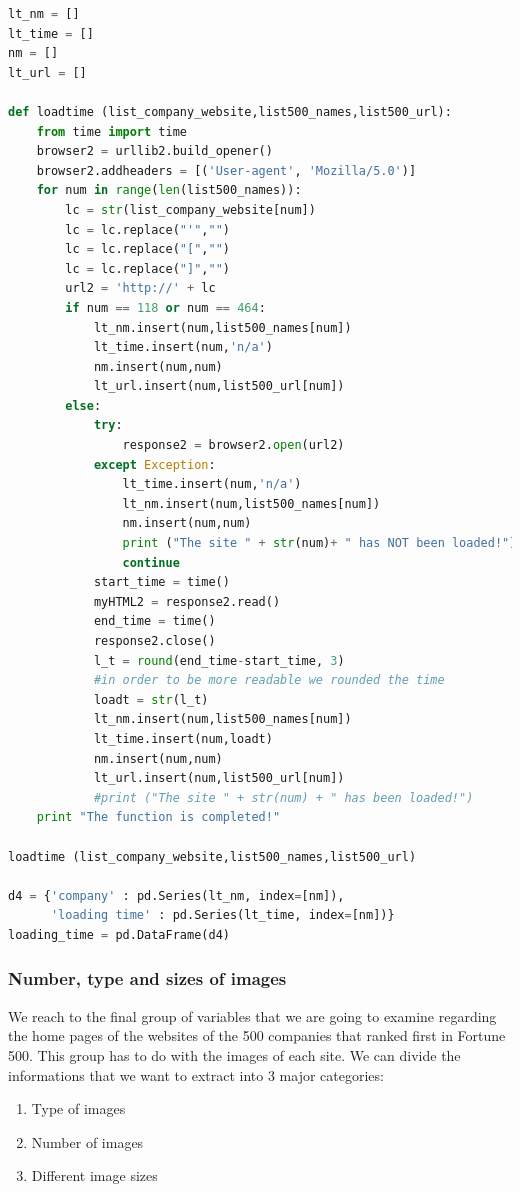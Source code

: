 \documentclass{article}
\begin{document}
\begin{lstlisting}[language=Python]
lt_nm = [] 
lt_time = []
nm = []
lt_url = []

def loadtime (list_company_website,list500_names,list500_url):
    from time import time
    browser2 = urllib2.build_opener()
    browser2.addheaders = [('User-agent', 'Mozilla/5.0')]
    for num in range(len(list500_names)):
        lc = str(list_company_website[num])        
        lc = lc.replace("'","")   
        lc = lc.replace("[","")
        lc = lc.replace("]","")
        url2 = 'http://' + lc
        if num == 118 or num == 464:            
            lt_nm.insert(num,list500_names[num])            
            lt_time.insert(num,'n/a')
            nm.insert(num,num)
            lt_url.insert(num,list500_url[num])           
        else:
            try:
                response2 = browser2.open(url2)
            except Exception:
                lt_time.insert(num,'n/a')
                lt_nm.insert(num,list500_names[num])  
                nm.insert(num,num)
                print ("The site " + str(num)+ " has NOT been loaded!")
                continue     
            start_time = time()
            myHTML2 = response2.read()
            end_time = time()
            response2.close()
            l_t = round(end_time-start_time, 3) 
            #in order to be more readable we rounded the time
            loadt = str(l_t)
            lt_nm.insert(num,list500_names[num])            
            lt_time.insert(num,loadt)
            nm.insert(num,num)
            lt_url.insert(num,list500_url[num])
            #print ("The site " + str(num) + " has been loaded!")
    print "The function is completed!"

loadtime (list_company_website,list500_names,list500_url)

d4 = {'company' : pd.Series(lt_nm, index=[nm]),
      'loading time' : pd.Series(lt_time, index=[nm])}
loading_time = pd.DataFrame(d4)    
\end{lstlisting}
\subsubsection{Number, type and sizes of images}
We reach to the final group of variables that we are going to examine regarding the home pages of the websites of the 500 companies that ranked first in Fortune 500. This group has to do with the images of each site. We can divide the informations that we want to extract into 3 major categories:
\begin{enumerate}
\item Type of images
\item Number of images
\item Different image sizes
\end{enumerate}
\end{document}
